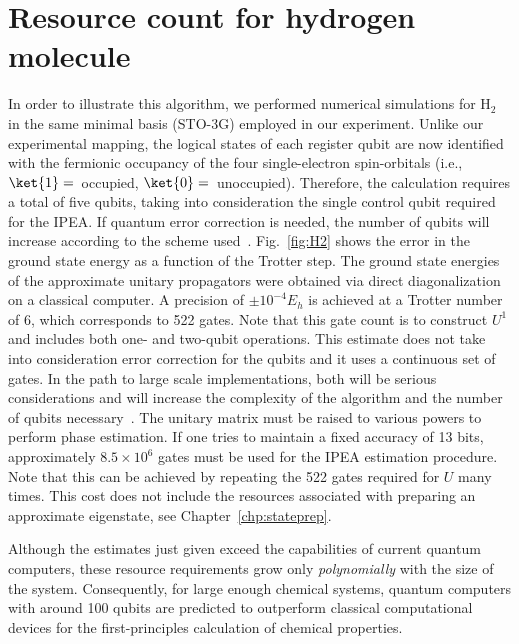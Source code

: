 \documentclass[11pt,oneside,final]{huthesis}%
\begin{document}
\section{Resource count for hydrogen molecule}

In order to illustrate this algorithm, we performed numerical
simulations for H$_2$ in the same minimal basis (STO-3G) employed in our
experiment. Unlike our experimental mapping, the logical states of each register
qubit are now identified with the fermionic occupancy of the four
single-electron spin-orbitals (i.e., $\ket{1}=$~occupied, $\ket{0}=$~unoccupied).
Therefore, the calculation requires a total of five qubits, taking into
consideration the single control qubit required for the IPEA. If quantum error
correction is needed, the number of qubits will increase according to the scheme
used~\cite{Nielsen00}. Fig.~\ref{fig:H2} shows the error in the ground state energy
as a function of the Trotter step. The ground state energies of the approximate
unitary propagators were obtained via direct diagonalization on a classical
computer. A precision of $\pm 10^{-4}E_h$ is achieved at a Trotter number of 6,
which corresponds to 522 gates. Note that this gate count is to construct
${U}^1$ and includes both one- and two-qubit operations. This estimate does
not take into consideration error correction for the qubits and it uses a
continuous set of gates. In the path to large scale implementations, both will
be serious considerations and will increase the complexity of the algorithm and
the number of qubits necessary~\cite{Nielsen00,Clark09}. The unitary matrix must be
raised to various powers to perform phase estimation. If one tries to maintain
a fixed accuracy of 13 bits, approximately $8.5\times10^6$ gates must be used for the
IPEA estimation procedure. Note that this can be achieved by repeating the 522
gates required for ${U}$ many times. This cost does not include the
resources associated with preparing an approximate eigenstate, see Chapter~\ref{chp:stateprep}.

Although the estimates just given exceed the capabilities of current quantum
computers, these resource requirements grow only \emph{polynomially} with the
size  of the system. Consequently, for large enough chemical systems, quantum
computers with around 100 qubits are predicted to outperform classical
computational devices for the first-principles calculation of chemical
properties.
\end{document}
